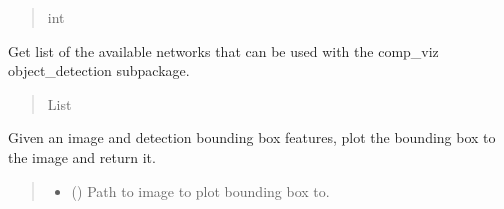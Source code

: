 \documentclass[letterpaper,10pt,english]{sphinxmanual}
\begin{document}
\begin{fulllineitems}
\begin{fulllineitems}
\begin{quote}
\begin{description}
\sphinxAtStartPar
int

\end{description}\end{quote}

\end{fulllineitems}


\begin{fulllineitems}
\label{\detokenize{comp_viz.utils:comp_viz.utils.toolbox.ObjectDetection.get_networks}}
\pysigstartsignatures
{}
\pysigstopsignatures
\sphinxAtStartPar
Get list of the available networks that can be used with the comp\_viz object\_detection sub\sphinxhyphen{}package.
\begin{quote}\begin{description}
\sphinxAtStartPar
List

\end{description}\end{quote}

\end{fulllineitems}


\begin{fulllineitems}
\label{\detokenize{comp_viz.utils:comp_viz.utils.toolbox.ObjectDetection.get_pred_bboxes_image}}
\pysigstartsignatures
{}
\pysigstopsignatures
\sphinxAtStartPar
Given an image and detection bounding box features, plot the bounding box to the image and return it.
\begin{quote}\begin{description}
\begin{itemize}
\item {} 
\sphinxAtStartPar
{} () \textendash{} Path to image to plot bounding box to.


\end{itemize}
\end{description}
\end{quote}
\end{fulllineitems}
\end{fulllineitems}
\end{document}

